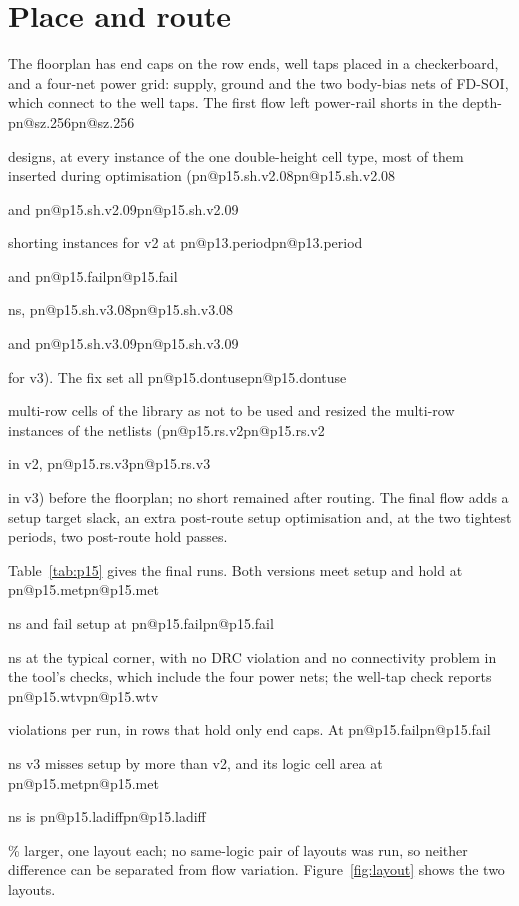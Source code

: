 \documentclass[11pt,a4paper]{report}
\makeatletter
\DeclareRobustCommand{\R}[1]{\ifcsname pn@#1\endcsname\csname pn@#1\endcsname\else
  \PackageError{report}{number key '#1' is not defined in macros.tex}{Run tools/make_paper_macros.py --target report}\fi}
\makeatother
\begin{document}
\section{Place and route}
The floorplan has end caps on the row ends, well taps placed in a checkerboard, and a four-net power grid: supply,
ground and the two body-bias nets of FD-SOI, which connect to the well taps. The first flow left power-rail shorts in the depth-\R{sz.256} designs, at every instance of the one double-height cell type, most of them inserted during optimisation (\R{p15.sh.v2.08} and \R{p15.sh.v2.09} shorting instances for v2 at \R{p13.period} and \R{p15.fail} ns, \R{p15.sh.v3.08} and \R{p15.sh.v3.09} for v3). The
fix set all \R{p15.dontuse} multi-row cells of the library as not to be used and resized the multi-row instances of
the netlists (\R{p15.rs.v2} in v2, \R{p15.rs.v3} in v3) before the floorplan; no short remained after routing. The
final flow adds a setup target slack, an extra post-route setup optimisation and, at the two tightest periods, two
post-route hold passes. 

Table~\ref{tab:p15} gives the final runs. Both versions meet setup and hold at \R{p15.met} ns and fail setup at
\R{p15.fail} ns at the typical corner, with no DRC violation and no connectivity problem in the tool's checks, which
include the four power nets; the well-tap check reports \R{p15.wtv} violations per run, in rows that hold only end
caps. At \R{p15.fail} ns v3 misses setup by more than v2, and its logic cell area at \R{p15.met} ns is
\R{p15.ladiff}\% larger, one layout each; no same-logic pair of layouts was run, so neither difference can be
separated from flow variation. Figure~\ref{fig:layout} shows the two layouts.
\end{document}

